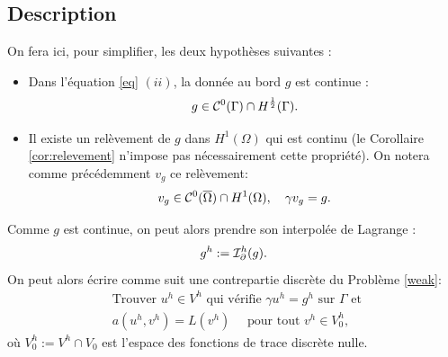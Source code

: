 \documentclass[11pt]{book}
\def\a{{\bf a}}
\newcommand{\caI}{{\cal I}}
\newcommand{\caC}{{\cal C}}
\begin{document}
\subsection{Description}

On fera ici, pour simplifier, les deux hypothèses suivantes :

\begin{itemize}

\item Dans l'équation \eqref{eq} $(ii)$, la donnée au bord $g$ est continue : \[ g \in \caC^0(\Gamma) \cap H^{\frac12}(\Gamma).\]

\item Il existe un relèvement de $g$ dans $H^1(\Omega)$ qui est continu (le Corollaire \ref{cor:relevement} n'impose pas nécessairement cette propriété). On notera comme précédemment $v_g$ ce relèvement:
\[
v_g \in \caC^0(\overline{\Omega}) \cap H^1(\Omega), \quad \gamma v_g = g.
\]

\end{itemize}
Comme $g$ est continue, on peut alors prendre son interpolée de Lagrange :
\[
g^h := \caI^h_\partial (g).
\]
On peut alors écrire comme suit une contrepartie discrète du Problème \eqref{weak}:
\begin{align} 
\label{weakh}
&\mbox{Trouver } u^h\in V^h \mbox{ qui vérifie } \gamma u^h=g^h \mbox{ sur } \Gamma \mbox{ et }\nonumber\\
&
a(u^h,v^h) = L(v^h) \quad \textrm{ pour tout } v^h \in V^h_0,
\end{align}
où  $V^h_0 := V^h \cap V_0$ est l'espace des fonctions de trace discrète nulle.
\end{document}
